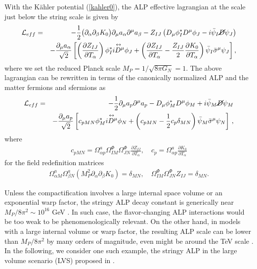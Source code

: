 \documentclass[preprint,prd,aps,tighten,nofootinbib,amssymb]{revtex4}
\newcommand{\bea}{\begin{eqnarray}}
\newcommand{\eea}{\end{eqnarray}}
\begin{document}
With the K\"ahler potential (\ref{kahler0}),  the ALP effective lagrangian at the scale just below the string scale  is given by
\bea
\mathcal{L}_{eff} & = & -\frac{1}{2}\big(\partial_\alpha\partial_\beta K_0\big)\partial_\mu a_\alpha \partial^\mu a_\beta -
Z_{IJ}\left(D_\mu\phi_I^* D^\mu \phi_J - i\bar\psi_I \cancel{D} \psi_J\right)
\nonumber \\
&& - \frac{ \partial_\mu a_\alpha}{\sqrt{2}} \left[ \left(\frac{\partial Z_{IJ}}{\partial T_\alpha}\right)
\phi_I^* \overset{\leftrightarrow}{i D^\mu}\phi_J + \left(\frac{\partial Z_{IJ}}{\partial T_\alpha}-\frac{Z_{IJ}}{2}\frac{\partial K_0}{\partial T_\alpha}\right)\bar\psi_I\bar\sigma^\mu \psi_J\right] ,
\eea
where we set the reduced Planck scale $M_P=1/\sqrt{8\pi G_N}=1$.
The above lagrangian can be rewritten in terms of the canonically normalized ALP and the matter fermions and sfermions
as
\bea
\mathcal{L}_{eff} & = & -\frac{1}{2} \partial_\mu a_p \partial^\mu a_p -D_\mu \phi_M^* D^\mu \phi_M + i\bar\psi_M\cancel{D} \psi_M
\nonumber \\
&&-\frac{\partial_\mu a_p}{\sqrt{2}} \left[ c_{pMN} \phi_M^* \overset{\leftrightarrow}{i D^\mu}\phi_N + \left(c_{pMN}-\frac{1}{2} c_p\delta_{MN}\right)\bar\psi_M\bar\sigma^\mu \psi_N\right] \, ,
\eea
where
\bea
c_{pMN}  =  \Omega^a_{\alpha p} \Omega^\Phi_{IM}\Omega^{\Phi}_{JN} \frac{\partial Z_{IJ}}{\partial T_\alpha}, \quad
c_p  =  \Omega^a_{\alpha p} \frac{\partial K_0}{\partial T_\alpha} 
\eea
for the field redefinition matrices
\bea\Omega^a_{\alpha M}\Omega^a_{\beta N} (M_P^2\partial_\alpha\partial_\beta K_0) = \delta_{MN}, \quad  \Omega^\Phi_{I M}\Omega^\Phi_{J N} Z_{IJ} = \delta_{MN}.\eea

Unless the compactification involves a large internal space volume or an exponential warp factor, the  
stringy ALP decay constant  is generically near  $M_P/8\pi^2 \sim 10^{16}$ GeV \cite{Choi:1985je,Svrcek:2006yi}.
In such case, the flavor-changing ALP interactions would be too weak to be phenomenologically relevant.
On the other hand, in models with a large internal volume or warp factor, the resulting ALP scale can be  lower than $M_P/8\pi^2$ by many orders of magnitude, even might be around the TeV scale \cite{Antoniadis:1998ig,Burgess:1998px,Choi:2003wr,Flacke:2006ad,Balasubramanian:2005zx}.
In the following, we consider one such example, the stringy ALP in the large volume scenario (LVS) proposed in \cite{Balasubramanian:2005zx}.
\end{document}
